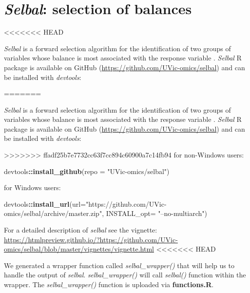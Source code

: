 \documentclass[openany]{book}
\newenvironment{Shaded}{\begin{snugshade}}{\end{snugshade}}
\newcommand{\KeywordTok}[1]{\textcolor[rgb]{0.13,0.29,0.53}{\textbf{#1}}}
\newcommand{\DataTypeTok}[1]{\textcolor[rgb]{0.13,0.29,0.53}{#1}}
\newcommand{\StringTok}[1]{\textcolor[rgb]{0.31,0.60,0.02}{#1}}
\newcommand{\OperatorTok}[1]{\textcolor[rgb]{0.81,0.36,0.00}{\textbf{#1}}}
\newcommand{\NormalTok}[1]{#1}
\begin{document}
\chapter{\texorpdfstring{\emph{Selbal}: selection of
balances}{Selbal: selection of balances}}\label{selbal}
<<<<<<< HEAD

\emph{Selbal} is a forward selection algorithm for the identification of
two groups of variables whose balance is most associated with the
response variable \citep{rivera2018balances}. \emph{Selbal} R package is
available on GitHub (\url{https://github.com/UVic-omics/selbal}) and can
be installed with \emph{devtools}:

=======

\emph{Selbal} is a forward selection algorithm for the identification of
two groups of variables whose balance is most associated with the
response variable \citep{rivera2018balances}. \emph{Selbal} R package is
available on GitHub (\url{https://github.com/UVic-omics/selbal}) and can
be installed with \emph{devtools}:

>>>>>>> ffadf25b7e7732cc63f7cc894c60900a7c14fb94
for non-Windows users:

\begin{Shaded}
\begin{Highlighting}[]
\NormalTok{devtools}\OperatorTok{::}\KeywordTok{install_github}\NormalTok{(}\DataTypeTok{repo =} \StringTok{"UVic-omics/selbal"}\NormalTok{)}
\end{Highlighting}
\end{Shaded}

for Windows users:

\begin{Shaded}
\begin{Highlighting}[]
\NormalTok{devtools}\OperatorTok{::}\KeywordTok{install_url}\NormalTok{(}\DataTypeTok{url=}\StringTok{"https://github.com/UVic-omics/selbal/archive/master.zip"}\NormalTok{, }
                      \DataTypeTok{INSTALL_opt=} \StringTok{"--no-multiarch"}\NormalTok{)}
\end{Highlighting}
\end{Shaded}

For a detailed description of \emph{selbal} see the vignette:
\url{https://htmlpreview.github.io/?https://github.com/UVic-omics/selbal/blob/master/vignettes/vignette.html}
<<<<<<< HEAD

We generated a wrapper function called \emph{selbal\_wrapper()} that
will help us to handle the output of \emph{selbal}.
\emph{selbal\_wrapper()} will call \emph{selbal()} function within the
wrapper. The \emph{selbal\_wrapper()} function is uploaded via
\textbf{functions.R}.
\end{document}
